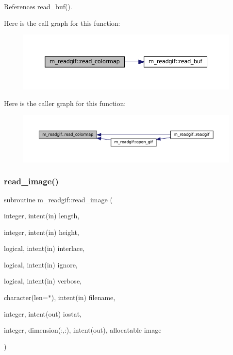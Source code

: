References read\+\_\+buf().

Here is the call graph for this function\+:\nopagebreak
\begin{figure}[H]
\begin{center}
\leavevmode
\includegraphics[width=350pt]{namespacem__readgif_aabaf13dcb1e665b2524049e5661ca4b6_cgraph}
\end{center}
\end{figure}
Here is the caller graph for this function\+:\nopagebreak
\begin{figure}[H]
\begin{center}
\leavevmode
\includegraphics[width=350pt]{namespacem__readgif_aabaf13dcb1e665b2524049e5661ca4b6_icgraph}
\end{center}
\end{figure}
\mbox{\label{namespacem__readgif_a4af978d944dbefb3ddeb81cd8c54d0f9}} 
\subsubsection{\texorpdfstring{read\+\_\+image()}{read\_image()}}
{\footnotesize\ttfamily subroutine m\+\_\+readgif\+::read\+\_\+image (\begin{DoxyParamCaption}\item[{integer, intent(in)}]{length,  }\item[{integer, intent(in)}]{height,  }\item[{logical, intent(in)}]{interlace,  }\item[{logical, intent(in)}]{ignore,  }\item[{logical, intent(in)}]{verbose,  }\item[{character(len=$\ast$), intent(in)}]{filename,  }\item[{integer, intent(out)}]{iostat,  }\item[{integer, dimension(\+:,\+:), intent(out), allocatable}]{image }\end{DoxyParamCaption})\hspace{0.3cm}{\ttfamily [private]}}




